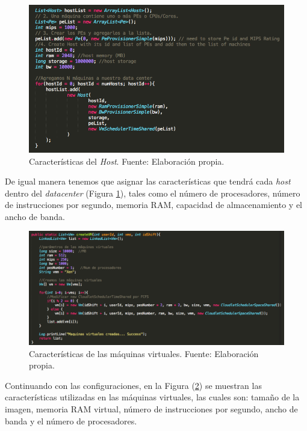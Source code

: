 \setcounter{figure}{9}
\renewcommand\thefigure{\arabic{figure}}
\begin{figure}[h!]
	\centering
	\includegraphics[scale=0.5]{media/caracteristicas_host}
	\caption{Características del \textit{Host}. Fuente: Elaboración propia.}
	\label{fig:HCar}
	
\end{figure}

De igual manera tenemos que asignar las caracter\'isticas que tendr\'a cada \textit{host} dentro del \textit{datacenter} (Figura \ref{fig:HCar}), tales como el n\'umero de procesadores, n\'umero de instrucciones por segundo, memoria RAM, capacidad de almacenamiento y el ancho de banda.

\newpage

\setcounter{figure}{10}
\renewcommand\thefigure{\arabic{figure}}
\begin{figure}[h!]
	\centering
	\includegraphics[scale=0.3]{media/creacion_vm}
	\caption{Características de las máquinas virtuales. Fuente: Elaboración propia.}
	\label{fig:VCar}
\end{figure}


Continuando con las configuraciones, en la Figura (\ref{fig:VCar}) se muestran las caracter\'isticas utilizadas en las m\'aquinas virtuales, las cuales son: tamaño de la imagen, memoria RAM virtual, n\'umero de instrucciones por segundo, ancho de banda y el n\'umero de procesadores.



